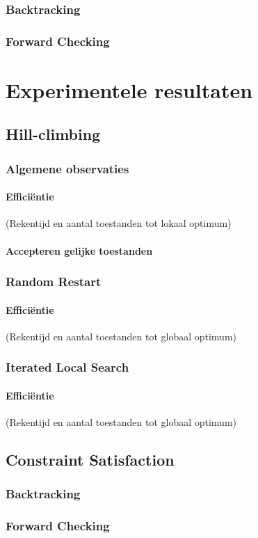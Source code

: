 \documentclass[]{report}
\begin{document}
\subsection{Backtracking}
\subsection{Forward Checking}

\chapter{Experimentele resultaten}
\section{Hill-climbing}
\subsection{Algemene observaties}
\subsubsection{Effici\"{e}ntie}
(Rekentijd en aantal toestanden tot lokaal optimum)
\subsubsection{Accepteren gelijke toestanden}
\subsection{Random Restart}
\subsubsection{Effici\"{e}ntie}
(Rekentijd en aantal toestanden tot globaal optimum)
\subsection{Iterated Local Search}
\subsubsection{Effici\"{e}ntie}
(Rekentijd en aantal toestanden tot globaal optimum)
\section{Constraint Satisfaction}
\subsection{Backtracking}
\subsection{Forward Checking}
\end{document}
